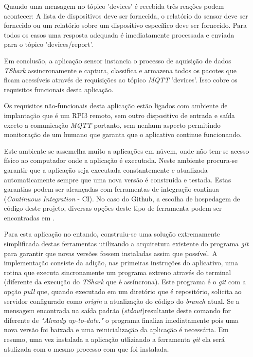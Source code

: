 Quando uma mensagem no tópico 'devices' é recebida três reações podem acontecer:
A lista de dispositivos deve ser fornecida, o relatório do sensor deve ser
fornecido ou um relatório sobre um dispositivo específico deve ser fornecido.
Para todos os casos uma resposta adequada é imediatamente processada e enviada
para o tópico 'devices/report'.

Em conclusão, a aplicação sensor instancia o processo de aquisição de dados
\emph{TShark} assincronamente e captura, classifica e armazena todos os pacotes
que ficam acessíveis através de requisições ao tópico \emph{MQTT} 'devices'.
Isso cobre os requisitos funcionais desta aplicação.

Os requisitos não-funcionais desta aplicação estão ligados com ambiente de
implantação que é um RPI3 remoto, sem outro dispositivo de entrada e saída
exceto a comunicação \emph{MQTT} portanto, sem nenhum aspecto permitindo
monitoração de um humano que garanta que o aplicativo continue funcionando.

Este ambiente se assemelha muito a aplicações em núvem, onde não tem-se acesso
físico ao computador onde a aplicação é executada. Neste ambiente procura-se
garantir que a aplicação seja executada constantemente e atualizada
automaticamente sempre que uma nova versão é construida e testada. Estas
garantias podem ser alcançadas com ferramentas de integração contínua
(\emph{Continuous Integration} - CI). No caso do Github, a escolha de hospedagem
de código deste projeto, diversas opções deste tipo de ferramenta podem ser
encontradas em \cite{githubdeploy}.

Para esta aplicação no entando, construiu-se uma solução extremamente
simplificada destas ferramentas utilizando a arquitetura existente do programa
\emph{git} para garantir que novas versões fossem instaladas assim que possível.
A implementação consiste da adição, nas primeiras instruções do aplicativo,
uma rotina que executa sincronamente um programa extreno através do terminal
(diferente da execução do \emph{TShark} que é assíncrona). Este programa é
o \emph{git} com a opção \emph{pull} que, quando executado em um diretório que
é repositório, solicita ao servidor configurado como \emph{origin} a atualização
do código do \emph{branch} atual. Se a mensagem encontrada na saída padrão
(\emph{stdout})resultante deste comando for diferente de
\emph{"Already up-to-date."} o programa finaliza imediatamente pois uma nova
versão foi baixada e uma reinicialização da aplicação é necessária.
Em resumo, uma vez instalada a aplicação utliziando a ferramenta \emph{git} ela
será atulizada com o mesmo processo com que foi instalada.

